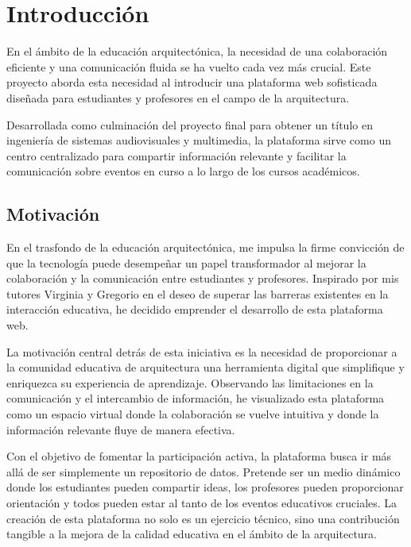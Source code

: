\documentclass[a4paper, 12pt]{book}
\begin{document}

\cleardoublepage
\chapter{Introducción}
\label{sec:intro} %

En el ámbito de la educación arquitectónica, la necesidad de una colaboración eficiente y una 
comunicación fluida se ha vuelto cada vez más crucial. Este proyecto aborda esta necesidad al introducir 
una plataforma web sofisticada diseñada para estudiantes y profesores en el campo de la arquitectura. 

Desarrollada como culminación del proyecto final para obtener un título en ingeniería de sistemas audiovisuales 
y multimedia, la plataforma sirve como un centro centralizado para compartir información relevante y facilitar 
la comunicación sobre eventos en curso a lo largo de los cursos académicos.

\section{Motivación}
\label{sec:seccion}


En el trasfondo de la educación arquitectónica, me impulsa la firme convicción de que la tecnología puede desempeñar un papel transformador al mejorar la colaboración y la comunicación entre estudiantes y profesores. Inspirado por mis tutores Virginia y Gregorio en el deseo de superar las barreras existentes en la interacción educativa, he decidido emprender el desarrollo de esta plataforma web.

La motivación central detrás de esta iniciativa es la necesidad de proporcionar a la comunidad educativa de arquitectura una herramienta digital que simplifique y enriquezca su experiencia de aprendizaje. Observando las limitaciones en la comunicación y el intercambio de información, he visualizado esta plataforma como un espacio virtual donde la colaboración se vuelve intuitiva y donde la información relevante fluye de manera efectiva.

Con el objetivo de fomentar la participación activa, la plataforma busca ir más allá de ser simplemente un repositorio de datos. Pretende ser un medio dinámico donde los estudiantes pueden compartir ideas, los profesores pueden proporcionar orientación y todos pueden estar al tanto de los eventos educativos cruciales. La creación de esta plataforma no solo es un ejercicio técnico, sino una contribución tangible a la mejora de la calidad educativa en el ámbito de la arquitectura.
\end{document}

